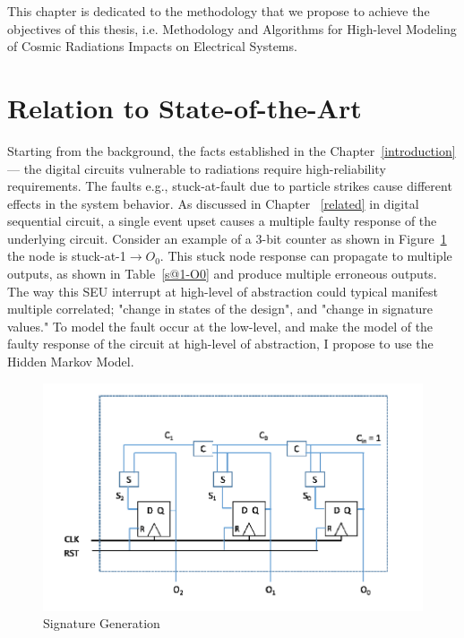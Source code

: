
This chapter is dedicated to the methodology that we propose to achieve the objectives of this thesis, i.e. Methodology and Algorithms for High-level Modeling of Cosmic Radiations Impacts on Electrical Systems.



\section{Relation to State-of-the-Art}
Starting from the background, the facts established in the Chapter~\ref{introduction}--- the digital circuits vulnerable to radiations require high-reliability requirements. The faults e.g., stuck-at-fault due to particle strikes cause different effects in the system behavior. As discussed in Chapter ~\ref{related} in digital sequential circuit, a single event upset causes a multiple faulty response of the underlying circuit. Consider an example of  a 3-bit counter as shown in Figure~\ref{fig:counter} the node is stuck-at-1$\rightarrow O_0$. This stuck node response can propagate to multiple outputs, as shown in Table~\ref{s@1-O0} and produce multiple erroneous outputs. The way this SEU interrupt at high-level of abstraction could typical manifest multiple correlated; "change in states of the design", and "change in signature values." To model the fault occur at the low-level, and make the model of the faulty response of the circuit at high-level of abstraction, I propose to use the Hidden Markov Model. 



\begin{figure}[tb!]

 \centering
  \captionsetup{justification=centering}    
   \includegraphics[scale=0.6]{Figures/counter.png}
   \caption{Signature Generation}
\label{fig:counter}
\end{figure}



